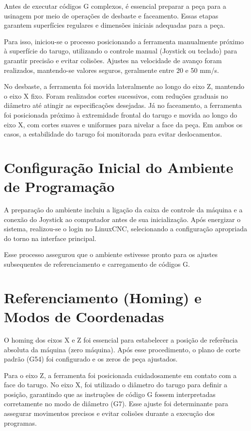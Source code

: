 \documentclass[twoside,a4paper]{refart}
\begin{document}
Antes de executar códigos G complexos, é essencial preparar a peça para a usinagem por meio de operações de desbaste e faceamento. Essas etapas garantem superfícies regulares e dimensões iniciais adequadas para a peça.

Para isso, iniciou-se o processo posicionando a ferramenta manualmente próximo à superfície do tarugo, utilizando o controle manual (Joystick ou teclado) para garantir precisão e evitar colisões. Ajustes na velocidade de avanço foram realizados, mantendo-se valores seguros, geralmente entre 20 e 50 mm/s.

No desbaste, a ferramenta foi movida lateralmente ao longo do eixo Z, mantendo o eixo X fixo. Foram realizados cortes sucessivos, com reduções graduais no diâmetro até atingir as especificações desejadas. Já no faceamento, a ferramenta foi posicionada próximo à extremidade frontal do tarugo e movida ao longo do eixo X, com cortes suaves e uniformes para nivelar a face da peça. Em ambos os casos, a estabilidade do tarugo foi monitorada para evitar deslocamentos.

\section{Configuração Inicial do Ambiente de Programação}

A preparação do ambiente incluiu a ligação da caixa de controle da máquina e a conexão do Joystick ao computador antes de sua inicialização. Após energizar o sistema, realizou-se o login no LinuxCNC, selecionando a configuração apropriada do torno na interface principal.

Esse processo assegurou que o ambiente estivesse pronto para os ajustes subsequentes de referenciamento e carregamento de códigos G.

\section{Referenciamento (Homing) e Modos de Coordenadas}

O homing dos eixos X e Z foi essencial para estabelecer a posição de referência absoluta da máquina (zero máquina). Após esse procedimento, o plano de corte padrão (G54) foi configurado e os zeros de peça ajustados.

Para o eixo Z, a ferramenta foi posicionada cuidadosamente em contato com a face do tarugo. No eixo X, foi utilizado o diâmetro do tarugo para definir a posição, garantindo que as instruções de código G fossem interpretadas corretamente no modo de diâmetro (G7). Esse ajuste foi determinante para assegurar movimentos precisos e evitar colisões durante a execução dos programas.
\end{document}
